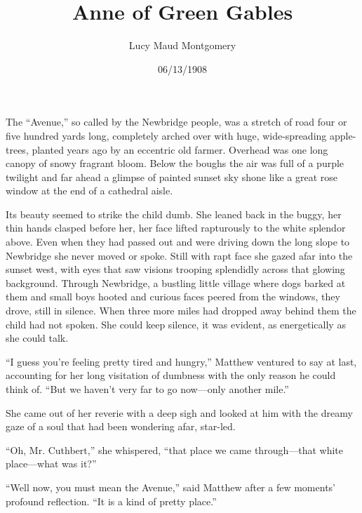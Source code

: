 \documentclass[a4paper]{article}
\title{Anne of Green Gables}
\author{Lucy Maud Montgomery}
\date{06/13/1908}
\begin{document}
\maketitle
The “Avenue,” so called by the Newbridge people, was a stretch of road four or five hundred yards long, completely arched over with huge, wide-spreading apple-trees, planted years ago by an eccentric old farmer. Overhead was one long canopy of snowy fragrant bloom. Below the boughs the air was full of a purple twilight and far ahead a glimpse of painted sunset sky shone like a great rose window at the end of a cathedral aisle.



Its beauty seemed to strike the child dumb. She leaned back in the buggy, her thin hands clasped before her, her face lifted rapturously to the white splendor above. Even when they had passed out and were driving down the long slope to Newbridge she never moved or spoke. Still with rapt face she gazed afar into the sunset west, with eyes that saw visions trooping splendidly across that glowing background. Through Newbridge, a bustling little village where dogs barked at them and small boys hooted and curious faces peered from the windows, they drove, still in silence. When three more miles had dropped away behind them the child had not spoken. She could keep silence, it was evident, as energetically as she could talk.

                                   “I guess you’re feeling pretty tired and hungry,” Matthew ventured to say at last, accounting for her long visitation of dumbness with the only reason he could think of. “But we haven’t very far to go now—only another mile.”

She came out of her reverie                            with a deep sigh and looked at him with the dreamy gaze of a soul that had been                     wondering afar, star-led.

“Oh, Mr. Cuthbert,” she whispered, “that place we came through—that white place—what was it?”

“Well now, you must mean the Avenue,” said Matthew after a few moments’ profound reflection. “It is a kind of pretty place.”
\end{document}
